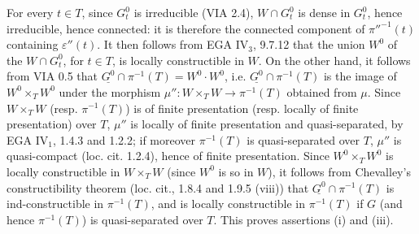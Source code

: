 For every $t\in T$, since $G_t^0$ is irreducible (VIA 2.4), $W\cap G_t^0$ is dense in $G_t^0$, hence irreducible, hence connected: it is therefore the connected component of $\pi''^{-1}(t)$ containing $\varepsilon''(t)$. It then follows from EGA IV$_3$, 9.7.12 that the union $W^0$ of the $W\cap G_t^0$, for $t\in T$, is locally constructible in $W$. On the other hand, it follows from VIA 0.5 that $\underline{G^0}\cap\pi^{-1}(T)=W^0\cdot W^0$, i.e. $\underline{G^0}\cap\pi^{-1}(T)$ is the image of $W^0\times_TW^0$ under the morphism $\mu'':W\times_TW\to\pi^{-1}(T)$ obtained from $\mu$. Since $W\times_TW$ (resp. $\pi^{-1}(T)$) is of finite presentation (resp. locally of finite presentation) over $T$, $\mu''$ is locally of finite presentation and quasi-separated, by EGA IV$_1$, 1.4.3 and 1.2.2; if moreover $\pi^{-1}(T)$ is quasi-separated over $T$, $\mu''$ is quasi-compact (loc. cit. 1.2.4), hence of finite presentation. Since $W^0\times_TW^0$ is locally constructible in $W\times_TW$ (since $W^0$ is so in $W$), it follows from Chevalley's constructibility theorem (loc. cit., 1.8.4 and 1.9.5 (viii)) that $\underline{G^0}\cap\pi^{-1}(T)$ is ind-constructible in $\pi^{-1}(T)$, and is locally constructible in $\pi^{-1}(T)$ if $G$ (and hence $\pi^{-1}(T)$) is quasi-separated over $T$. This proves assertions (i) and (iii).

